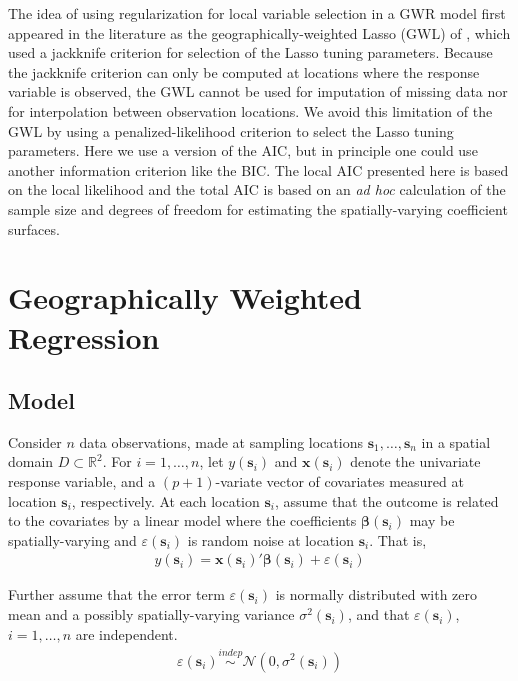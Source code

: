 \documentclass[authoryear, review, 11pt]{elsarticle}
\begin{document}
	The idea of using regularization for local variable selection in a GWR model first appeared in the literature as the geographically-weighted Lasso (GWL) of \cite{Wheeler:2009}, which used a jackknife criterion for selection of the Lasso tuning parameters. Because the jackknife criterion can only be computed at locations where the response variable is observed, the GWL cannot be used for imputation of missing data nor for interpolation between observation locations. We avoid this limitation of the GWL by using a penalized-likelihood criterion to select the Lasso tuning parameters. Here we use a version of the AIC, but in principle one could use another information criterion like the BIC. The local AIC presented here is based on the local likelihood \citep{Loader:1999} and the total AIC is based on an \emph{ad hoc} calculation of the sample size and degrees of freedom for estimating the spatially-varying coefficient surfaces.

\section{Geographically Weighted Regression \label{section:GWR}}
	\subsection{Model}	
	Consider $n$ data observations, made at sampling locations $\bm{s}_1, \dots, \bm{s}_n$ in a spatial domain $D \subset \mathbb{R}^2$. For $i = 1, \dots, n$, let $y(\bm{s}_i)$ and $\bm{x}(\bm{s}_i)$ denote the univariate response variable, and a $(p+1)$-variate vector of covariates measured at location $\bm{s}_i$, respectively. At each location $\bm{s}_i$, assume that the outcome is related to the covariates by a linear model where the coefficients $\bm{\beta}(\bm{s}_i)$ may be spatially-varying and $\varepsilon(\bm{s}_i)$ is random noise at location $\bm{s}_i$. That is,
	\begin{align}\label{eq:lm(s)}
		y(\bm{s}_i) = \bm{x}(\bm{s}_i)' \bm{\beta}(\bm{s}_i) + \varepsilon(\bm{s}_i)
	\end{align}
	
	Further assume that the error term $\varepsilon(\bm{s}_i)$ is normally distributed with zero mean and a possibly spatially-varying variance $\sigma^2(\bm{s}_i)$, and that $\varepsilon(\bm{s}_i)$, $i=1, \dots, n$ are independent.
	\begin{align} \label{eq:err}
		\varepsilon(\bm{s}_i) \overset{indep}{\sim} \mathcal{N} \left( 0,\sigma^2(\bm{s}_i) \right)
	\end{align}
	
\end{document}
